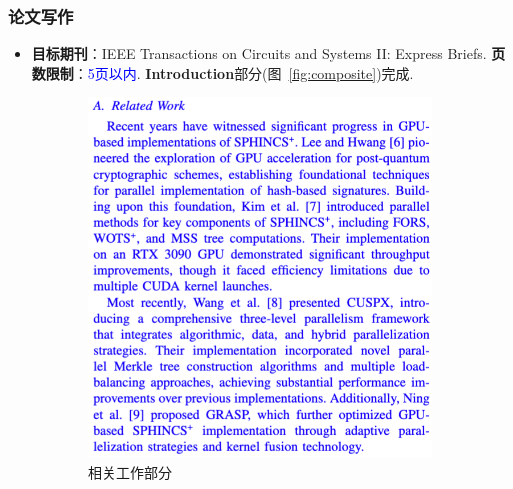 \documentclass[slide]{../../custom}
\begin{document}
\begin{frame}
  \frametitle{论文写作}
  \begin{itemize}
    \item \textbf{目标期刊}：IEEE Transactions on Circuits and Systems II: Express Briefs. \textbf{页数限制}：\textcolor{blue}{5页以内}. \textbf{Introduction}部分(图~\ref{fig:composite})完成.
  \end{itemize}
  \begin{figure}[ht]
    \centering
    \begin{subfigure}[b]{0.32\textwidth}
      \centering
      \includegraphics[width=\textwidth]{./fig/relate_work.png}
      \caption{相关工作部分}
      \label{fig:related_work}
    \end{subfigure}\hfill
    \begin{subfigure}[b]{0.32\textwidth}
      \centering

\end{subfigure}
\end{figure}
\end{frame}
\end{document}

